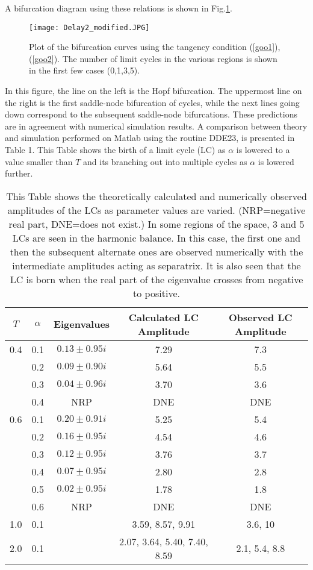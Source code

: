 \documentclass[12pt]{article}
\begin{document}
A bifurcation diagram using these relations is shown in Fig.\ref{fig:foo2}.

\begin{figure}[h!]
	\begin{center}
		\texttt{[image: Delay2\_modified.JPG]}
		\caption{Plot of the bifurcation curves using the tangency condition (\ref{goo1}),(\ref{goo2}). The number of limit cycles in the various regions is shown in the first few cases (0,1,3,5). }
		\label{fig:foo2}
	\end{center}
\end{figure}

In this figure, the line on the left is the Hopf bifurcation. The uppermost line on the right is the first saddle-node bifurcation of cycles, while the next lines going down correspond to the subsequent saddle-node bifurcations. These predictions are in agreement with numerical simulation results. A comparison between theory and simulation 
 performed on Matlab using the routine DDE23,
 is presented in Table 1.  This Table shows the birth of a limit cycle (LC) as $\alpha$ is lowered to a value smaller than $T$ and its branching out into multiple cycles as $\alpha$ is lowered further.\\
 
 

\begin{table}
\begin{tabular}{c|c|c|c|c}
	\hline
	$T$ & $\alpha$ & Eigenvalues & Calculated LC Amplitude & Observed LC Amplitude\\
	\hline
	0.4 & 0.1 & $0.13 \pm  0.95i$ & 7.29 & 7.3 \\
	& 0.2 & $0.09 \pm  0.90i$ & 5.64 & 5.5 \\
	& 0.3 & $0.04 \pm  0.96i$ & 3.70 & 3.6 \\
	& 0.4 & NRP & DNE & DNE \\
	\hline
	0.6 & 0.1 & $0.20 \pm  0.91i$ & 5.25 & 5.4 \\
	& 0.2 & $0.16 \pm  0.95i$ & 4.54 & 4.6 \\
	& 0.3 & $0.12 \pm  0.95i$ & 3.76 & 3.7 \\
	& 0.4 & $0.07 \pm  0.95i$ & 2.80 & 2.8 \\
	& 0.5 & $0.02 \pm  0.95i$ & 1.78 & 1.8 \\
	& 0.6 & NRP & DNE & DNE \\
	\hline
	1.0 & 0.1 & & 3.59, 8.57, 9.91 & 3.6, 10 \\
	2.0 & 0.1 & & 2.07, 3.64, 5.40, 7.40, 8.59 & 2.1, 5.4, 8.8\\
	\hline
\end{tabular} 
\caption{ 
	This Table shows the theoretically calculated and numerically observed amplitudes of the LCs as parameter values are varied. (NRP=negative real part, DNE=does not exist.) In some regions of the space, 3 and 5 LCs are seen in the harmonic balance. In this case, the first one and then the subsequent alternate ones are observed numerically with the intermediate amplitudes acting as separatrix. It is also seen that the LC is born when the real part of the eigenvalue crosses from negative to positive.}
\end{table}
\end{document}

